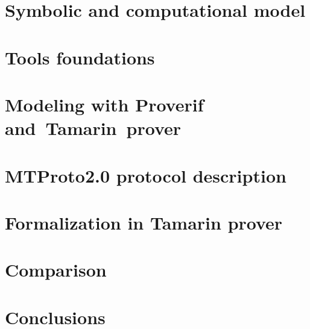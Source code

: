 \documentclass[target=bach,aauheader=]{thud}
\begin{document}
\chapter{Symbolic and computational model}


\chapter{Tools foundations}


\chapter{Modeling with Proverif and~Tamarin~prover}


\chapter{MTProto2.0 protocol description}


\chapter{Formalization in Tamarin prover}


\chapter{Comparison}


\chapter{Conclusions}



\backmatter




\end{document}

